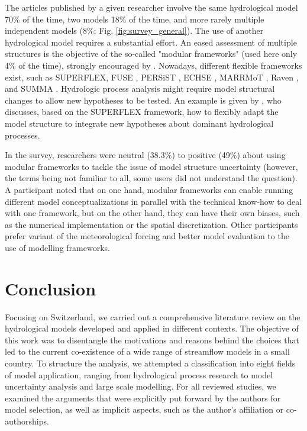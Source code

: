 \documentclass[10pt,a4paper]{article}
\begin{document}
The articles published by a given researcher involve the same hydrological model 70\% of the time, two models 18\% of the time, and more rarely multiple independent models (8\%; Fig. \ref{fig:survey_general}). The use of another hydrological model requires a substantial effort. An eased assessment of multiple structures is the objective of the so-called "modular frameworks" (used here only 4\% of the time), strongly encouraged by \citet{Clark2011a}. Nowadays, different flexible frameworks exist, such as SUPERFLEX, FUSE \citep{Clark2008}, PERSiST \citep{Futter2014}, ECHSE \citep{Kneis2015}, MARRMoT \citep{Knoben2019}, Raven \citep{Craig2020}, and SUMMA \citep{Clark2015}. Hydrologic process analysis might require model structural changes to allow new hypotheses to be tested. An example is given by \citet{DalMolin2020}, who discusses, based on the SUPERFLEX framework, how to flexibly adapt the model structure to integrate new hypotheses about dominant hydrological processes. 

In the survey, researchers were neutral (38.3\%) to positive (49\%) about using modular frameworks to tackle the issue of model structure uncertainty (however, the terms being not familiar to all, some users did not understand the question). A participant noted that on one hand, modular frameworks can enable running different model conceptualizations in parallel with the technical know-how to deal with one framework, but on the other hand, they can have their own biases, such as the numerical implementation or the spatial discretization. Other participants prefer variant of the meteorological forcing and better model evaluation to the use of modelling frameworks.


\section{Conclusion}
\label{sec:conclusion}

Focusing on Switzerland, we carried out a comprehensive literature review on the hydrological models developed and applied in different contexts. The objective of this work was to disentangle the motivations and reasons behind the choices that led to the current co-existence of a wide range of streamflow models in a small country. To structure the analysis, we attempted a classification into eight fields of model application, ranging from hydrological process research to model uncertainty analysis and large scale modelling. For all reviewed studies, we examined the arguments that were explicitly put forward by the authors for model selection, as well as implicit aspects, such as the author's affiliation or co-authorships. 
\end{document}
